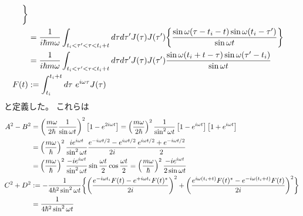 \begin{subequations}
\begin{align}
    \bigg\}
\notag\\&
    =
    \dfrac{1}{i \hbar m \omega}
    \int_{t_i < \tau' < \tau < t_i + t}
        d\tau d\tau'
    J(\tau) J(\tau')
    \bigg\{
    \dfrac{
        \sin \omega (\tau - t_i - t)
        \sin \omega (t_i - \tau')
    }{\sin \omega t}
    \bigg\}
\notag\\&
    =
    \dfrac{1}{i \hbar m \omega}
    \int_{t_i < \tau' < \tau < t_i + t}
        d\tau d\tau'
    J(\tau) J(\tau')
    \dfrac{
        \sin \omega (t_i + t - \tau)
        \sin \omega (\tau' - t_i)
    }{\sin \omega t}
\\
    F(t)
    &:=
    \int_{t_i}^{t_i + t} d\tau\ 
        e^{i \omega \tau}
        J(\tau)
\end{align}
\end{subequations}
と定義した。
これらは
\begin{subequations}
\begin{align}
    A^2 - B^2
    &=
    \left(
        \dfrac{m \omega}{2 \hbar}
        \dfrac{1}{\sin \omega t}
    \right)^2
    \left[
        1
        - e^{2 i \omega t}
    \right]
=
    \left(
        \dfrac{m \omega}{2 \hbar}
    \right)^2
    \dfrac{1}{\sin^2 \omega t}
    \left[
        1
    -
        e^{i \omega t}
    \right]
    \left[
        1
    +
        e^{i \omega t}
    \right]
\notag\\&=
    \left(
        \dfrac{m \omega}{\hbar}
    \right)^2
    \dfrac{
        i
        e^{i \omega t}
    }{\sin^2 \omega t}
    \dfrac{
            e^{- i \omega t/2}
        -
            e^{  i \omega t/2}
    }{2 i}
    \dfrac{
        e^{i \omega t/2}
    +
        e^{- i \omega t/2}
    }{2}
\notag\\&=
    \left(
        \dfrac{m \omega}{\hbar}
    \right)^2
    \dfrac{
    -
        i
        e^{i \omega t}
    }{\sin^2 \omega t}
    \sin \dfrac{\omega t}{2}
    \cos \dfrac{\omega t}{2}
=
    \left(
        \dfrac{m \omega}{\hbar}
    \right)^2
    \dfrac{
    -
        i
        e^{i \omega t}
    }{2 \sin \omega t}
\\
    C^2 + D^2
    &:=
    -
    \dfrac{1}{4 \hbar^2 \sin^2 \omega t}
    \bigg\{
        \bigg(
            \dfrac{
            e^{- i \omega t_i} F(t)
        -
            e^{+ i \omega t_i} F(t)^*
        }{ 2i }
        \bigg)^2
    +
        \bigg(
            \dfrac{
            e^{i \omega (t_i + t)} F(t)^*
        -
            e^{- i \omega (t_i + t)} F(t)
        }{ 2i }
        \bigg)^2
    \bigg\}
\notag\\&
    =
    \dfrac{1}{4 \hbar^2 \sin^2 \omega t}

\end{align}
\end{subequations}

